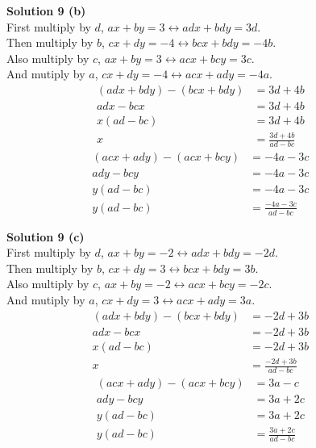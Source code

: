 \textbf{Solution 9 (b)} \\
First multiply by $d$, $ax + by = 3 \leftrightarrow adx + bdy = 3d$. \\
Then multiply by $b$, $cx + dy = -4 \leftrightarrow bcx + bdy = -4b$. \\
Also multiply by $c$, $ax + by = 3 \leftrightarrow acx + bcy = 3c$. \\
And mutiply by $a$, $cx + dy  = -4 \leftrightarrow acx + ady = -4a$. 
\begin{align*}
    (adx + bdy) - (bcx + bdy) &= 3d + 4b && \\
    adx - bcx &= 3d + 4b && \\
    x(ad - bc) &= 3d + 4b && \\
    x &= \frac{3d + 4b}{ad - bc}
\end{align*}
\begin{align*}
    (acx + ady) - (acx + bcy) &= -4a - 3c && \\
    ady - bcy &= -4a - 3c && \\
    y(ad - bc) &= -4a - 3c && \\
    y(ad - bc) &= \frac{-4a - 3c}{ad - bc} 
\end{align*}

\textbf{Solution 9 (c)} \\
First multiply by $d$, $ax + by = -2 \leftrightarrow adx + bdy = -2d$. \\
Then multiply by $b$, $cx + dy = 3 \leftrightarrow bcx + bdy = 3b$. \\
Also multiply by $c$, $ax + by = -2 \leftrightarrow acx + bcy = -2c$. \\
And mutiply by $a$, $cx + dy  = 3 \leftrightarrow acx + ady = 3a$. 
\begin{align*}
    (adx + bdy) - (bcx + bdy) &= -2d + 3b && \\
    adx - bcx &= -2d + 3b && \\
    x(ad - bc) &= -2d + 3b && \\
    x &= \frac{-2d + 3b}{ad - bc}
\end{align*}
\begin{align*}
    (acx + ady) - (acx + bcy) &= 3a - c && \\
    ady - bcy &= 3a + 2c && \\
    y(ad - bc) &= 3a + 2c && \\
    y(ad - bc) &= \frac{3a + 2c}{ad - bc} 
\end{align*}

